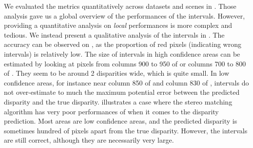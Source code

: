 We evaluated the metrics quantitatively across datasets and scenes in . Those analysis gave us a global overview of the performances of the intervals. However, providing a quantitative analysis on \textit{local} performances is more complex and tedious. We instead present a qualitative analysis of the intervals in . The accuracy can be observed on , as the proportion of red pixels (indicating wrong intervals) is relatively low. The size of intervals in high confidence areas can be estimated by looking at pixels from columns 900 to 950 of  or columns 700 to 800 of . They seem to be around 2 disparities wide, which is quite small. In low confidence areas, for instance near column 850 of  and column 830 of , intervals do not over-estimate to much the maximum potential error between the predicted disparity and the true disparity.  illustrates a case where the stereo matching algorithm has very poor performances of when it comes to the disparity prediction. Most areas are low confidence areas, and the predicted disparity is sometimes hundred of pixels apart from the true disparity. However, the intervals are still correct, although they are necessarily very large.  

